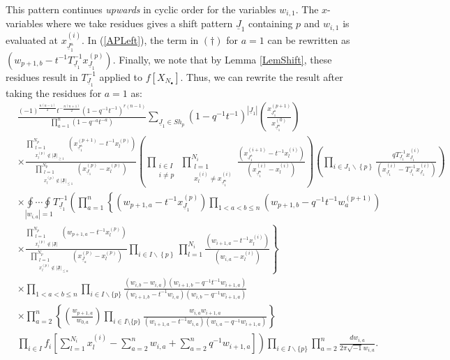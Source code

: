 \documentclass{amsart}
\renewcommand{\triangle}{\vartriangle}
\newcommand{\Ju}{{\underline{J}}}
\theoremstyle{remark}
\numberwithin{thm}{section}
\numberwithin{equation}{section}
\begin{document}
This pattern continues \textit{upwards} in cyclic order for the variables $w_{i,1}$.
The $x$-variables where we take residues gives a shift pattern $\Ju_1$ containing $p$ and $w_{i,1}$ is evaluated at $x^{(i)}_{\Ju_1^\triangle}$.
In (\ref{APLeft}), the term in $(\dagger)$ for $a=1$ can be rewritten as $\left( w_{p+1,b}-t^{-1}T_{\Ju_1}^{-1}x^{(p)}_{\Ju_1} \right)$.
Finally, we note that by Lemma \ref{LemShift}, these residues result in $T_{\Ju_1}^{-1}$ applied to $f\left[ X_{N_\bullet} \right]$.
Thus, we can rewrite the result after taking the residues for $a=1$ as:
\begin{align*}
&\frac{(-1)^{\frac{n(n-1)}{2}}t^{-\frac{n(n+1)}{2}}(1-q^{-1}t^{-1})^{r(n-1)}}{\prod_{a=1}^n(1-q^{-a}t^{-a})}
\sum_{\Ju_1\in Sh_p}(1-q^{-1}t^{-1})^{|\Ju_1|}\left(\frac{x^{(p+1)}_{\Ju_1^\triangle}}{x^{(0)}_{\Ju_1^\triangle}}\right)
\\
&\times
\frac{\displaystyle
\prod_{\substack{l=1\\x^{(p)}_{l}\not\in|\mathbf{\Ju}|_{\ge 1}}}^{N_p}\left( x^{(p+1)}_{\Ju_1^\triangle}-t^{-1}x^{(p)}_{l} \right)}
{\displaystyle
\prod_{\substack{l=1\\x^{(p)}_{l}\not\in|\mathbf{\Ju}|_{\le 1}}}^{N_p}\left( x^{(p)}_{\Ju_1}-x^{(p)}_{l} \right)}
\left( \prod_{\substack{i\in I\\i\not= p}}\, 
\prod_{\substack{l=1\\x^{(i)}_{l}\not=x^{(i)}_{\Ju_1^\triangle}}}^{N_i}\frac{\left(x^{(i+1)}_{\Ju_1^\triangle}-t^{-1}x^{(i)}_{l}\right)}
{\left( x^{(i)}_{\Ju_1^\triangle}-x^{(i)}_{l} \right)}
\right)
\left( \prod_{i\in J_1\backslash \left\{ p \right\}} 
\frac{q T_{\Ju_1}^{-1}x^{(i)}_{\Ju_1}}
{\left( x^{(i)}_{\Ju_1}-T_{\Ju_1}^{-1}x^{(i)}_{\Ju_1} \right)}
\right)\\
&\times
\underset{|w_{i,a}|=1}{\oint\cdots\oint}
T_{\Ju_1}^{-1}\left(
\prod_{a=1}^{n}\left\{
\left( w_{p+1,a}-t^{-1}x^{(p)}_{\Ju_1} \right)
\prod_{1< a<b\le n}
\left( w_{p+1,b}-q^{-1}t^{-1}w^{(p+1)}_{a} \right)
\right.\right.\\
&\times
\left.
\frac{\displaystyle
\prod_{\substack{l=1\\ x^{(p)}_{l}\not\in|\mathbf{\Ju}|}}^{N_p}\left( w_{p+1,a}-t^{-1}x^{(p)}_{l} \right)}
{\displaystyle
\prod^{N_p}_{\substack{l=1\\x^{(p)}_{l}\not\in |\mathbf{\Ju}|_{\le a}}}\left( x^{(p)}_{\Ju_a}-x^{(p)}_{l} \right)}
\prod_{i\in I\backslash\left\{ p \right\}}\prod_{l=1}^{N_{i}}
\frac{\displaystyle \left( w_{i+1,a}-t^{-1}x^{(i)}_{l} \right)}{\displaystyle\left( w_{i,a}-x^{(i)}_{l} \right)}\right\}\\
&\times\prod_{1< a<b\le n}
\prod_{i\in I\backslash\{p\}}
\frac{(w_{i,b}-w_{i,a})(w_{i+1,b}-q^{-1}t^{-1}w_{i+1,a})}{(w_{i+1,b}-t^{-1}w_{i,a})(w_{i,b}-q^{-1}w_{i+1,a})}\\
&\times\prod_{a=2}^{n} \left\{
\left(\frac{w_{p+1,a}}{w_{0,a}}\right)
\prod_{i\in I\setminus\{p\}}
\frac{w_{i,a}w_{i+1,a}}{\left(w_{i+1,a}-t^{-1}w_{i,a}\right)\left(w_{i,a}-q^{-1}w_{i+1,a}\right)} \right\}\\
&\left.
\prod_{i\in I}f_i\left[ \sum_{l=1}^{N_i}x_{l}^{(i)}-\sum_{a=2}^n w_{i, a}+\sum_{a=2}^nq^{-1} w_{i+1,a} \right]\right)\prod_{i\in I\backslash\{p\}}\prod_{a=2}^n\frac{dw_{i,a}}{2\pi\sqrt{-1}w_{i,a}}.
\end{align*}
\end{document}
